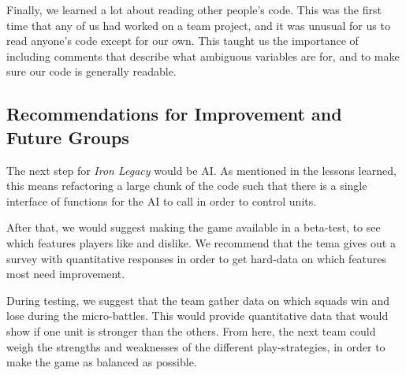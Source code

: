\documentclass{article}
\begin{document}
Finally, we learned a lot about reading other people's code.
    This was the first time that any of us had worked on a team project,
    and it was unusual for us to read anyone's code except for our own.
    This taught us the importance of including comments that describe what
    ambiguous variables are for, and to make sure our code is generally
    readable.

\subsection*{Recommendations for Improvement and Future Groups}

The next step for \emph{Iron Legacy} would be AI.
    As mentioned in the lessons learned, this means refactoring a large
    chunk of the code such that there is a single interface
    of functions for the AI to call in order to control units.

After that, we would suggest making the game available in a beta-test,
    to see which features players like and dislike.
    We recommend that the tema gives out a survey with quantitative
    responses in order to get hard-data on which features most need
    improvement.

During testing, we suggest that the team gather data on which squads
    win and lose during the micro-battles.
    This would provide quantitative data that would show if one unit
    is stronger than the others.
    From here, the next team could weigh the strengths and
    weaknesses of the different play-strategies, in order to make
    the game as balanced as possible.

\end{document}
